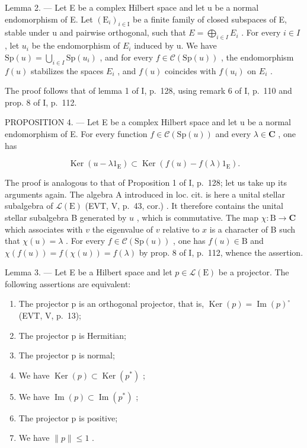 Lemma 2. --- Let E be a complex Hilbert space and let u be a normal endomorphism of E. Let \((\mathrm{E}_{i})_{i\in\mathrm{I}}\) be a finite family of closed subspaces of E, stable under u and pairwise orthogonal, such that \(E=\bigoplus_{i\in I}E_{i}\) . For every \(i\in I\) , let \(u_{i}\) be the endomorphism of \(E_{i}\) induced by u. We have \(\mathrm{Sp}(u)=\bigcup_{i\in I}\mathrm{Sp}(u_{i})\) , and for every \(f\in\mathcal{C}(\mathrm{Sp}(u))\) , the endomorphism \(f(u)\) stabilizes the spaces \(E_{i}\) , and \(f(u)\) coincides with \(f(u_{i})\) on \(E_{i}\) .

The proof follows that of lemma 1 of I, p.~128, using remark 6 of I, p.~110 and prop. 8 of I, p.~112.

PROPOSITION 4. --- Let E be a complex Hilbert space and let u be a normal endomorphism of E. For every function \(f \in \mathcal{C}(\mathrm{Sp}(u))\) and every \(\lambda \in \mathbf{C}\) , one has

\[
\operatorname{Ker} (u - \lambda 1 _ {\mathrm{E}}) \subset \operatorname{Ker} (f (u) - f (\lambda) 1 _ {\mathrm{E}}).
\]

The proof is analogous to that of Proposition 1 of I, p.~128; let us take up its arguments again. The algebra A introduced in loc. cit. is here a unital stellar subalgebra of \(\mathcal{L}(\mathrm{E})\) (EVT, V, p.~43, cor.) . It therefore contains the unital stellar subalgebra B generated by \(u\) , which is commutative. The map \(\chi: \mathrm{B} \to \mathbf{C}\) which associates with \(v\) the eigenvalue of \(v\) relative to \(x\) is a character of B such that \(\chi(u) = \lambda\) . For every \(f \in \mathcal{C}(\mathrm{Sp}(u))\) , one has \(f(u) \in \mathrm{B}\) and \(\chi(f(u)) = f(\chi(u)) = f(\lambda)\) by prop. 8 of I, p.~112, whence the assertion.

Lemma 3. --- Let E be a Hilbert space and let \(p \in \mathcal{L}(\mathrm{E})\) be a projector. The following assertions are equivalent:

\begin{enumerate}
\def\labelenumi{(\roman{enumi})}
\item
  The projector p is an orthogonal projector, that is, \(\operatorname{Ker}(p)=\operatorname{Im}(p)^{\circ}\) (EVT, V, p.~13);
\item
  The projector p is Hermitian;
\item
  The projector p is normal;
\item
  We have \(\operatorname{Ker}(p) \subset \operatorname{Ker}(p^*)\) ;
\item
  We have \(\operatorname{Im}(p) \subset \operatorname{Im}(p^*)\) ;
\item
  The projector p is positive;
\item
  We have \(\| p\| \leqslant 1\) .
\end{enumerate}

